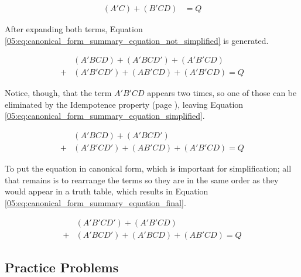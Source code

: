\begin{align}
  \label{05:eq:standard_form_example_repeated}
  (A'C)+(B'CD) &= Q
\end{align}

After expanding both terms, Equation \ref{05:eq:canonical_form_summary_equation_not_simplified} is generated.

\begin{align}
  \label{05:eq:canonical_form_summary_equation_not_simplified}
  &(A'BCD)+(A'BCD')+(A'B'CD) \\
  \nonumber
  +&(A'B'CD')+(AB'CD)+(A'B'CD) = Q
\end{align}

Notice, though, that the term $ A'B'CD $ appears two times, so one of those can be eliminated by the Idempotence property (page \pageref{BF:subsec:idempotence}), leaving Equation \ref{05:eq:canonical_form_summary_equation_simplified}.

\begin{align}
  \label{05:eq:canonical_form_summary_equation_simplified}
  &(A'BCD)+(A'BCD') \\
  \nonumber
  +&(A'B'CD')+(AB'CD)+(A'B'CD) = Q
\end{align}

To put the equation in canonical form, which is important for simplification; all that remains is to rearrange the terms so they are in the same order as they would appear in a truth table, which results in Equation \ref{05:eq:canonical_form_summary_equation_final}.

\begin{align}
  \label{05:eq:canonical_form_summary_equation_final}
  &(A'B'CD')+(A'B'CD) \\
  \nonumber
  +&(A'BCD')+(A'BCD)+(AB'CD) = Q
\end{align}

\subsection{Practice Problems}
\label{05:subsec:practice_with_canonical_forms}


